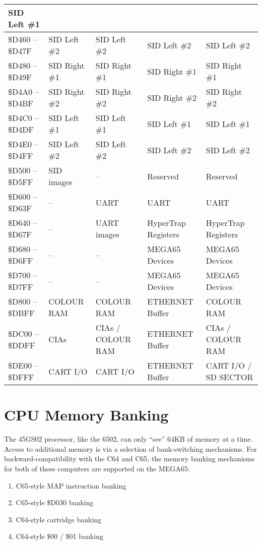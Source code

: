 \begin{longtable}{|p{2.2cm}|C{2cm}|C{2cm}|C{2cm}|C{2cm}|}
SID Left \#1 \\
\hline
\small \$D460 -- \$D47F & \small SID Left \#2 & SID Left \#2 & SID Left \#2 &
SID Left \#2 \\
\hline
\small \$D480 -- \$D49F & \small SID Right \#1 & SID Right \#1 & SID Right \#1 &
SID Right \#1 \\
\hline
\small \$D4A0 -- \$D4BF & \small SID Right \#2 & SID Right \#2 & SID Right \#2 &
SID Right \#2 \\
\hline
\small \$D4C0 -- \$D4DF & \small SID Left \#1 & SID Left \#1 & SID Left \#1 &
SID Left \#1 \\
\hline
\small \$D4E0 -- \$D4FF & \small SID Left \#2 & SID Left \#2 & SID Left \#2 &
SID Left \#2 \\
\hline
\small \$D500 -- \$D5FF & \small SID images & -- & Reserved & Reserved \\
\hline
\small \$D600 -- \$D63F & \small -- & UART & UART & UART \\
\hline
\small \$D640 -- \$D67F & \small -- & UART images & HyperTrap
Registers & HyperTrap Registers \\
\hline
\small \$D680 -- \$D6FF & \small -- & -- & MEGA65 Devices & MEGA65 Devices \\
\hline
\small \$D700 -- \$D7FF & \small -- & -- & MEGA65 Devices & MEGA65 Devices \\
\hline
\small \$D800 -- \$DBFF & \small COLOUR RAM & COLOUR RAM & ETHERNET Buffer & COLOUR RAM \\
\hline
\small \$DC00 -- \$DDFF & \small CIAs & CIAs / COLOUR RAM & ETHERNET Buffer & CIAs / COLOUR RAM \\
\hline
\small \$DE00 -- \$DFFF & \small CART I/O & CART I/O & ETHERNET Buffer & CART I/O / SD SECTOR \\
\hline
\end{longtable}

\section{CPU Memory Banking}
\label{sec:membanking}

The 45GS02 processor, like the 6502, can only ``see'' 64KB of memory
at a time. Access to additional memory is via a selection of
bank-switching mechanisms.  For backward-compatibility with the C64
and C65, the memory banking mechanisms for both of these computers
are supported on the MEGA65:
\begin{enumerate}
\item C65-style MAP instruction banking
\item C65-style \$D030 banking
\item C64-style cartridge banking
\item C64-style \$00 / \$01 banking
\end{enumerate}

